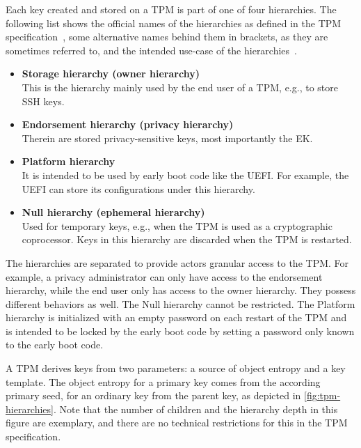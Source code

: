 Each key created and stored on a TPM is part of one of four hierarchies.
The following list shows the official names of the hierarchies as defined in the TPM specification~\cite{tpm20}, some alternative names behind them in brackets, as they are sometimes referred to, and the intended use-case of the hierarchies~\cite{Arthur2015}.
\begin{itemize}

  \item{\textbf{Storage hierarchy (owner hierarchy)}\\
  This is the hierarchy mainly used by the end user of a TPM, e.g., to store SSH keys.}

  \item{\textbf{Endorsement hierarchy (privacy hierarchy)}\\
  Therein are stored privacy-sensitive keys, most importantly the EK.}

  \item{\textbf{Platform hierarchy}\\
  It is intended to be used by early boot code like the UEFI\@.
  For example, the UEFI can store its configurations under this hierarchy.}

  \item{\textbf{Null hierarchy (ephemeral hierarchy)}\\
  Used for temporary keys, e.g., when the \ac{TPM} is used as a cryptographic coprocessor.
  Keys in this hierarchy are discarded when the \ac{TPM} is restarted.}

\end{itemize}


The hierarchies are separated to provide actors granular access to the \ac{TPM}\@.
For example, a privacy administrator can only have access to the endorsement hierarchy, while the end user only has access to the owner hierarchy.
They possess different behaviors as well.
The Null hierarchy cannot be restricted.
The Platform hierarchy is initialized with an empty password on each restart of the \ac{TPM} and is intended to be locked by the early boot code by setting a password only known to the early boot code.


 
A \ac{TPM} derives keys from two parameters: a source of object entropy and a key template.
The object entropy for a primary key comes from the according primary seed, for an ordinary key from the parent key, as depicted in \autoref{fig:tpm-hierarchies}.
Note that the number of children and the hierarchy depth in this figure are exemplary, and there are no technical restrictions for this in the \ac{TPM} specification.

